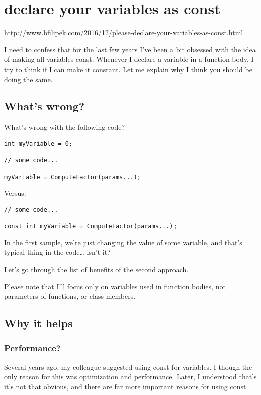 \section{declare your variables as const}
\url{http://www.bfilipek.com/2016/12/please-declare-your-variables-as-const.html}

I need to confess that for the last few years I’ve been a bit obsessed with the idea of making all variables const. Whenever I declare a variable in a function body, I try to think if I can make it constant. Let me explain why I think you should be doing the same.

\subsection{What’s wrong?}

What’s wrong with the following code?

\begin{verbatim}
int myVariable = 0;

// some code...

myVariable = ComputeFactor(params...);
\end{verbatim}
Versus:
\begin{verbatim}
// some code...

const int myVariable = ComputeFactor(params...);
\end{verbatim}

In the first sample, we’re just changing the value of some variable, and that’s typical thing in the code… isn’t it?

Let’s go through the list of benefits of the second approach.

Please note that I’ll focus only on variables used in function bodies, not parameters of functions, or class members. 

\subsection{Why it helps}

\subsubsection{Performance?}

Several years ago, my colleague suggested using const for variables. I though the only reason for this was optimization and performance. Later, I understood that’s it’s not that obvious, and there are far more important reasons for using const.

